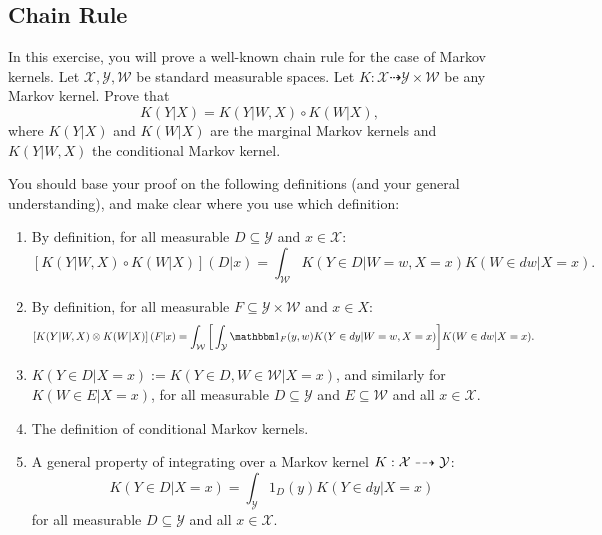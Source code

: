 \subsection{Chain Rule}

In this exercise, you will prove a well-known chain rule for the case of Markov kernels. 
Let $\mathcal{X},\mathcal{Y},\mathcal{W}$ be standard measurable spaces.
Let $K: \mathcal{X} \dashrightarrow \mathcal{Y} \times \mathcal{W}$ be any Markov kernel.
Prove that 
\begin{equation*}
  K(Y | X) = K(Y | W, X) \circ K(W | X),
\end{equation*}
where $K(Y | X)$ and $K(W | X)$ are the marginal Markov kernels and $K(Y | W, X)$ the conditional Markov kernel.

You should base your proof on the following definitions (and your general understanding), and make clear where you use which definition:
\begin{enumerate}
  \item By definition, for all measurable $D \subseteq \mathcal{Y}$ and $x \in \mathcal{X}$: 
    \begin{equation*}
      \left[ K(Y | W, X) \circ K(W | X)\right](D | x) = \int_{\mathcal{W}} K(Y \in D | W = w, X = x) K(W \in d w | X = x).
    \end{equation*}
  \item By definition, for all measurable $F \subseteq \mathcal{Y} \times \mathcal{W}$ and $x \in X$:
    \begin{equation*}
      \left[ K(Y | W, X) \otimes K(W | X)\right](F | x) = \int_{\mathcal{W}} \bigg[ \int_{\mathcal{Y}} \I_{F}(y, w) K(Y \in d y | W = w, X = x) \bigg] K(W \in d w | X = x).
  \end{equation*}
\item  $K(Y \in D | X = x) := K(Y \in D, W \in \mathcal{W} | X = x)$, and similarly for $K(W \in E | X = x)$, for all measurable $D \subseteq \mathcal{Y}$ and $E \subseteq \mathcal{W}$ and all $x \in \mathcal{X}$.
\item The definition of conditional Markov kernels.  
\item A general property of integrating over a Markov kernel $K : \mathcal{X} \dashrightarrow \mathcal{Y}$:
  $$K(Y \in D | X=x) = \int_{\mathcal{Y}} 1_D(y) K(Y \in dy|X=x)$$
   for all measurable $D \subseteq \mathcal{Y}$ and all $x \in \mathcal{X}$.
\end{enumerate} 

